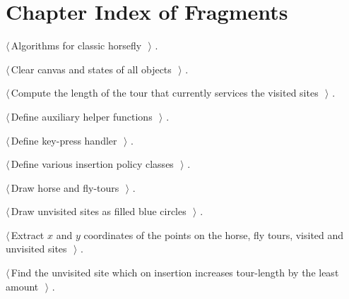 \documentclass[11.5pt]{report}
\begin{document}
\section{Chapter Index of Fragments}

{\small\begin{list}{}{\setlength{\itemsep}{-\parsep}\setlength{\itemindent}{-\leftmargin}}
\item $\langle\,$Algorithms for classic horsefly\nobreak\ {\footnotesize {}}$\,\rangle$ {\footnotesize {\NWtxtRefIn} .}
\item $\langle\,$Clear canvas and states of all objects\nobreak\ {\footnotesize {}}$\,\rangle$ {\footnotesize {\NWtxtRefIn} .}
\item $\langle\,$Compute the length of the tour that currently services the visited sites\nobreak\ {\footnotesize {}}$\,\rangle$ {\footnotesize {\NWtxtRefIn} .}
\item $\langle\,$Define auxiliary helper functions\nobreak\ {\footnotesize {}}$\,\rangle$ {\footnotesize {\NWtxtRefIn} .}
\item $\langle\,$Define key-press handler\nobreak\ {\footnotesize {}}$\,\rangle$ {\footnotesize {\NWtxtRefIn} .}
\item $\langle\,$Define various insertion policy classes\nobreak\ {\footnotesize {}}$\,\rangle$ {\footnotesize {\NWtxtRefIn} .}
\item $\langle\,$Draw horse and fly-tours\nobreak\ {\footnotesize {}}$\,\rangle$ {\footnotesize {\NWtxtRefIn} .}
\item $\langle\,$Draw unvisited sites as filled blue circles\nobreak\ {\footnotesize {}}$\,\rangle$ {\footnotesize {\NWtxtRefIn} .}
\item $\langle\,$Extract $x$ and $y$ coordinates of the points on the horse, fly tours, visited and unvisited sites\nobreak\ {\footnotesize {}}$\,\rangle$ {\footnotesize {\NWtxtRefIn} .}
\item $\langle\,$Find the unvisited site which on insertion increases tour-length by the least amount\nobreak\ {\footnotesize {}}$\,\rangle$ {\footnotesize {\NWtxtRefIn} .}

\end{list}}
\end{document}
